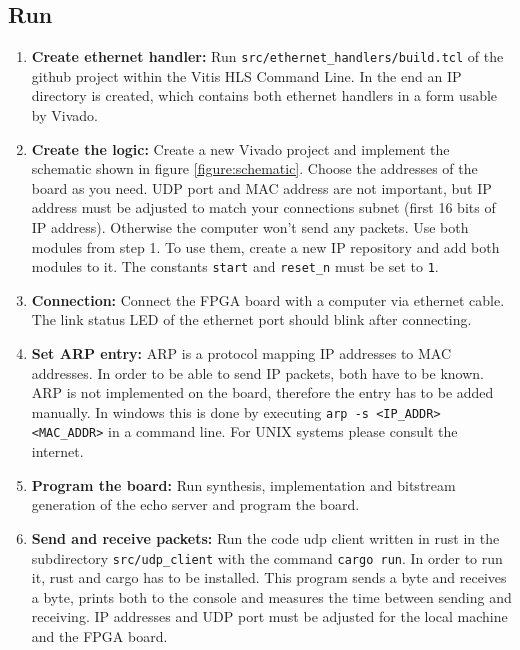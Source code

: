 \subsection{Run}
\begin{enumerate}
  \item \textbf{Create ethernet handler:} Run \texttt{src/ethernet_handlers/build.tcl} of the github project within the Vitis HLS Command Line. In the end an IP directory is created, which contains both ethernet handlers in a form usable by Vivado.
  \item \textbf{Create the logic:} Create a new Vivado project and implement the schematic shown in figure \ref{figure:schematic}. Choose the addresses of the board as you need. UDP port and MAC address are not important, but IP address must be adjusted to match your connections subnet (first 16 bits of IP address). Otherwise the computer won't send any packets. Use both modules from step 1. To use them, create a new IP repository and add both modules to it. The constants \texttt{start} and \texttt{reset\_n} must be set to \texttt{1}.
  \item \textbf{Connection:} Connect the FPGA board with a computer via ethernet cable. The link status LED of the ethernet port should blink after connecting.
  \item \textbf{Set ARP entry:} ARP is a protocol mapping IP addresses to MAC addresses. In order to be able to send IP packets, both have to be known. ARP is not implemented on the board, therefore the entry has to be added manually. In windows this is done by executing \texttt{arp -s <IP\_ADDR> <MAC\_ADDR>} in a command line. For UNIX systems please consult the internet.
  \item \textbf{Program the board:} Run synthesis, implementation and bitstream generation of the echo server and program the board.
  \item \textbf{Send and receive packets:} Run the code udp client written in rust in the subdirectory \texttt{src/udp\_client} with the command \texttt{cargo run}. In order to run it, rust and cargo has to be installed. This program sends a byte and receives a byte, prints both to the console and measures the time between sending and receiving. IP addresses and UDP port must be adjusted for the local machine and the FPGA board.
\end{enumerate}
